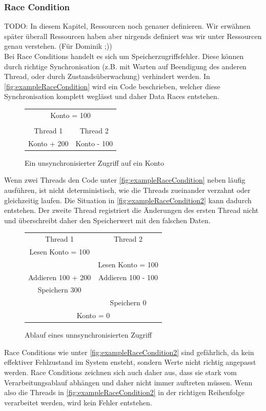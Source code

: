\documentclass[10pt,a4paper]{article}
\begin{document}
\subsubsection{Race Condition}\label{race_conditons}
\begin{flushleft}
TODO: In diesem Kapitel, Ressourcen noch genauer definieren. Wir erwähnen später überall Ressourcen haben aber nirgends definiert was wir unter Ressourcen genau verstehen. (Für Dominik ;))\\
Bei Race Conditions handelt es sich um Speicherzugriffsfehler. Diese können durch richtige Synchronisation (z.B. mit Warten auf Beendigung des anderen Thread, oder durch Zustandsüberwachung) verhindert werden. In \autoref{fig:exampleRaceCondition} wird ein Code beschrieben, welcher diese Synchronisation komplett weglässt und daher Data Races entstehen.
\begin{figure}[H]
\centering
\begin{tabular}{|cc|}
\hline
\multicolumn{2}{|c|}{Konto = 100} \\ 
 &  \\ 
Thread 1 & Thread 2 \\ 
Konto + 200 & Konto - 100 \\ 
\hline
\end{tabular}
\caption[Beispiel Race Condition]{Ein unsynchronisierter Zugriff auf ein Konto}
\label{fig:exampleRaceCondition}
\end{figure}
Wenn zwei Threads den Code unter \autoref{fig:exampleRaceCondition} neben läufig ausführen, ist nicht deterministisch, wie die Threads zueinander verzahnt oder gleichzeitig laufen. Die Situation in \autoref{fig:exampleRaceCondition2} kann dadurch entstehen. Der zweite Thread registriert die Änderungen des ersten Thread nicht und überschreibt daher den Speicherwert mit den falschen Daten.\\
\begin{figure}[H]
\centering
\begin{tabular}{|cc|}
\hline
Thread 1 & Thread 2\\
Lesen Konto = 100 & \\
& Lesen Konto = 100\\
Addieren 100 + 200 & Addieren 100 - 100\\
Speichern 300 &\\
& Speichern 0\\
\multicolumn{2}{|c|}{Konto = 0}\\
\hline
\end{tabular}
\caption[Race Condition]{Ablauf eines unnsynchronisierten Zugriff}
\label{fig:exampleRaceCondition2}
\end{figure}
Race Conditions wie unter \autoref{fig:exampleRaceCondition2} sind gefährlich, da kein effektiver Fehlzustand im System ensteht, sondern Werte nicht richtig angepasst werden. Race Conditions zeichnen sich auch daher aus, dass sie stark vom Verarbeitungsablauf abhängen und daher nicht immer auftreten müssen. Wenn also die Threads in \autoref{fig:exampleRaceCondition2} in der richtigen Reihenfolge verarbeitet werden, wird kein Fehler entstehen.\\

\end{flushleft}
\end{document}
